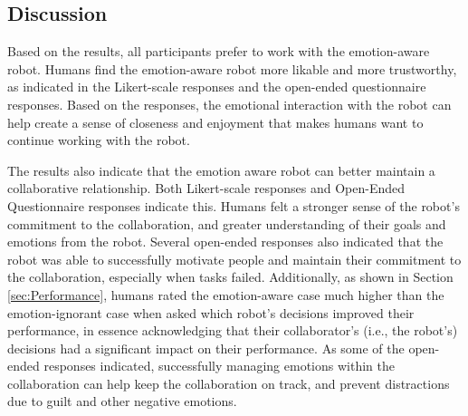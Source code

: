 \documentclass[12pt]{report}
\begin{document}
% 
% 

\subsection{Discussion}
Based on the results, all participants prefer to work with the emotion-aware
robot. Humans find the emotion-aware robot more likable and more trustworthy, as
indicated in the Likert-scale responses and the open-ended questionnaire
responses. Based on the responses, the emotional interaction with the robot can
help create a sense of closeness and enjoyment that makes humans want to
continue working with the robot.

The results also indicate that the emotion aware robot can better maintain a
collaborative relationship. Both Likert-scale responses and Open-Ended
Questionnaire responses indicate this. Humans felt a stronger sense of the
robot's commitment to the collaboration, and greater understanding of their
goals and emotions from the robot. Several open-ended responses also indicated
that the robot was able to successfully motivate people and maintain their
commitment to the collaboration, especially when tasks failed. Additionally, as
shown in Section \ref{sec:Performance}, humans rated the emotion-aware case much
higher than the emotion-ignorant case when asked which robot's decisions
improved their performance, in essence acknowledging that their collaborator's
(i.e., the robot's) decisions had a significant impact on their performance. As
some of the open-ended responses indicated, successfully managing emotions
within the collaboration can help keep the collaboration on track, and prevent
distractions due to guilt and other negative emotions.
\end{document}
